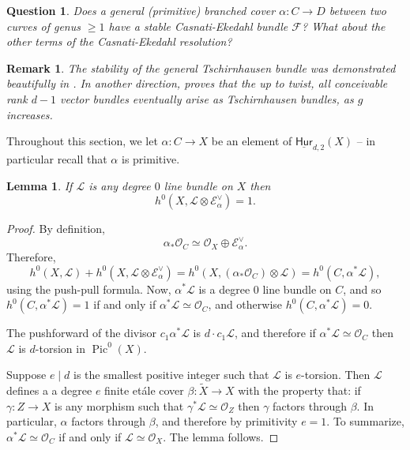 \documentclass[reqno, 11pt]{amsart}
\newtheorem{lemma}[theorem]{Lemma}
\newtheorem{remark}[theorem]{Remark}
\newtheorem{question}[theorem]{Question}
\DeclareMathOperator{\Pic}{Pic}
\renewcommand{\O}{\mathcal{O}}
\newcommand{\Hurfixed}[2]{\underline{\mathsf{Hur}}_{#1,#2}}
\begin{document}
\begin{question}
    \label{question:stableF}
    Does a general (primitive) branched cover $\alpha: C \to D$ between two curves of genus $\geq 1$ have a stable Casnati-Ekedahl bundle $\mathcal{F}$? What about the other terms of the Casnati-Ekedahl resolution? 
\end{question}

\begin{remark}
    The stability of the general Tschirnhausen bundle was demonstrated beautifully in \cite{coskun2024stability}. In another direction, \cite{deopurkar2022vector} proves that the up to twist, all conceivable rank $d-1$ vector bundles eventually arise as Tschirnhausen bundles, as $g$ increases. 
\end{remark}


Throughout this section, we let $\alpha: C \to X$ be an element of $\Hurfixed{d}{2}(X)$ -- in particular recall that $\alpha$ is primitive. 

\begin{lemma}
    \label{lemma:degree0twist}
    If $\mathcal{L}$ is any degree $0$ line bundle on $X$ then $$h^{0}(X, \mathcal{L} \otimes \mathcal{E}_{\alpha}^{\vee}) = 1.$$
\end{lemma}

\begin{proof}
    By definition, \[\alpha_{*} \O_{C} \simeq \O_{X} \oplus \mathcal{E}_{\alpha}^{\vee}.\]  Therefore, \[h^{0}(X,\mathcal{L}) + h^{0}(X, \mathcal{L} \otimes \mathcal{E}_{\alpha}^{\vee}) = h^{0}(X, (\alpha_{*} \O_{C})\otimes \mathcal{L}) = h^{0}(C, \alpha^{*} \mathcal{L}),\]  using the push-pull formula.  Now, $\alpha^{*} \mathcal{L}$ is a degree $0$ line bundle on $C$, and so $h^{0}(C, \alpha^{*} \mathcal{L}) = 1$ if and only if $\alpha^{*} \mathcal{L} \simeq \O_{C}$, and otherwise $h^{0}(C, \alpha^{*} \mathcal{L}) = 0$.  

    The pushforward of the divisor $c_{1} \alpha^{*} \mathcal{L}$ is $d \cdot c_{1} \mathcal{L}$, and therefore if $\alpha^{*} \mathcal{L} \simeq \O_{C}$ then $\mathcal{L}$ is $d$-torsion in $\Pic^{0}(X)$. 
    
    Suppose $e \mid d$ is the smallest positive integer such that $\mathcal{L}$ is $e$-torsion. Then $\mathcal{L}$ defines a a degree $e$ finite et\'ale cover $\beta: \tilde{X} \to X$ with the property that: if $\gamma: Z \to X$ is any morphism such that $\gamma^{*} \mathcal{L} \simeq \O_{Z}$ then $\gamma$ factors through $\beta$. In particular, $\alpha$ factors through $\beta$, and therefore by primitivity $e=1$.  To summarize, $\alpha^{*} \mathcal{L} \simeq \O_{C}$ if and only if $\mathcal{L} \simeq \O_{X}$.  The lemma follows.
\end{proof}
\end{document}
